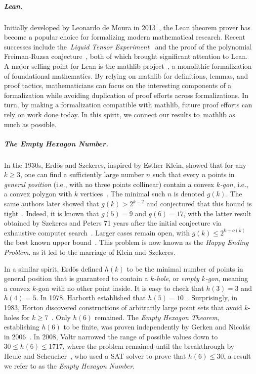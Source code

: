 \subparagraph*{Lean.}
Initially developed by Leonardo de Moura in 2013~\cite{demouraLeanTheoremProver2015},
the Lean theorem prover has become a popular choice for formalizing modern mathematical research.
Recent successes include the~\emph{Liquid Tensor Experiment}~\cite{Castelvecchi2021}
and the proof of the polynomial Freiman-Ruzsa conjecture~\cite{gowers2023conjecture, slomanATeamMathProves2023},
both of which brought significant attention to Lean.
A major selling point for Lean is the \textsf{mathlib} project~\cite{The_mathlib_Community_2020},
a monolithic formalization of foundational mathematics.
By relying on \textsf{mathlib} for definitions, lemmas, and proof tactics,
mathematicians can focus on the interesting components of a formalization
while avoiding duplication of proof efforts across formalizations.
In turn, by making a formalization compatible with \textsf{mathlib},
future proof efforts can rely on work done today.
In this spirit, we connect our results to~\textsf{mathlib} as much as possible.

\subparagraph*{The Empty Hexagon Number.}
In the 1930s,
Erd\H{o}s and Szekeres, inspired by Esther Klein, showed that for any $k \geq 3$,
one can find a sufficiently large number $n$
such that every $n$ points in \emph{general position}
(i.e., with no three points collinear)
contain a convex \emph{$k$-gon}, i.e., a convex polygon with $k$ vertices~\cite{35erdos_combinatorial_problem_geometry}.
The minimal such $n$ is denoted $g(k)$.
The same authors later showed that $g(k) > 2^{k-2}$
and conjectured that this bound is tight~\cite{60erdos_some_extremum_problems_elementary_geometry}.
Indeed, it is known that $g(5) = 9$ and $g(6) = 17$,
with the latter result obtained by Szekeres and Peters 71 years after the initial conjecture
via exhaustive computer search~\cite{06szekeres_computer_solution_17_point_erdos_szekeres_problem}.
Larger cases remain open,
with $g(k) \leq 2^{k+o(k)}$ the best known upper bound~\cite{suk2017erdos,holmsen2017two}.
This problem is now known as the \emph{Happy Ending Problem},
as it led to the marriage of Klein and Szekeres.

In a similar spirit,
Erd\H{o}s defined $h(k)$
to be the minimal number of points in general position
that is guaranteed to contain a \emph{$k$-hole},
or \emph{empty $k$-gon},
meaning a convex $k$-gon with no other point inside.
It is easy to check that $h(3) = 3$ and $h(4) = 5$.
In 1978, Harborth established that $h(5) = 10$~\cite{Harborth1978}.
Surprisingly, in 1983, Horton discovered constructions of arbitrarily large point sets that
avoid $k$-holes for $k \geq 7$~\cite{hortonSetsNoEmpty1983}.
Only $h (6)$ remained.
The \emph{Empty Hexagon Theorem},
establishing $h(6)$ to be finite,
was proven independently by Gerken and Nicolás in 2006~\cite{gerkenEmptyConvexHexagons2008,nicolasEmptyHexagonTheorem2007}.
In 2008, Valtr narrowed the range of possible values down to $30 \leq h(6) \leq 1717$,
where the problem remained until the breakthrough by Heule and Scheucher~\cite{emptyHexagonNumber},
who used a SAT solver to prove that $h(6) \leq 30$,
a result we refer to as the \emph{Empty Hexagon Number}.
